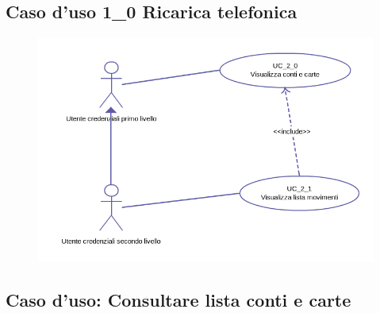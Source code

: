 \subsection{Caso d'uso 1\_0 Ricarica telefonica}
	\begin{figure}[!htbp]
	  \centering
	  \includegraphics[scale=0.60]{casi_uso/conti.png}
	\end{figure}
\subsection{Caso d'uso: Consultare lista conti e carte}

